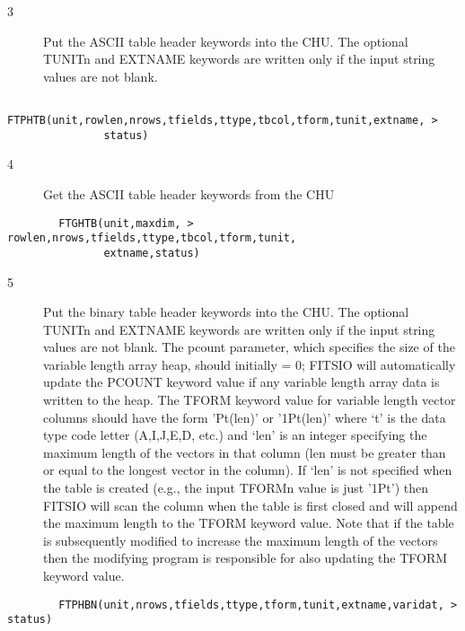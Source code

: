 \documentclass[11pt]{book}
\begin{document}
\begin{description}
\item[3 ] Put the ASCII table header keywords into the CHU. The optional
TUNITn and EXTNAME keywords are written only if the input string
values are not blank.
\end{description}

\begin{verbatim}
        FTPHTB(unit,rowlen,nrows,tfields,ttype,tbcol,tform,tunit,extname, >
               status)
\end{verbatim}

\begin{description}
\item[4 ] Get the ASCII table header keywords from the CHU
\end{description}

\begin{verbatim}
        FTGHTB(unit,maxdim, > rowlen,nrows,tfields,ttype,tbcol,tform,tunit,
               extname,status)
\end{verbatim}

\begin{description}
\item[5 ]Put the binary table header keywords into the CHU. The optional
   TUNITn and EXTNAME keywords are written only if the input string
   values are not blank.  The pcount parameter, which specifies the
   size of the variable length array heap, should initially = 0;
   FITSIO will automatically update the PCOUNT keyword value if any
   variable length array data is written to the heap.  The TFORM keyword
   value for variable length vector columns should have the form 'Pt(len)'
   or '1Pt(len)' where `t' is the data type code letter (A,I,J,E,D, etc.)
   and  `len' is an integer specifying the maximum length of the vectors
   in that column (len must be greater than or equal to the longest
   vector in the column).  If `len' is not specified when the table is
   created (e.g., the input TFORMn value is just '1Pt') then FITSIO will
   scan the column when the table is first closed and will append the
   maximum length to the TFORM keyword value.  Note that if the table
   is subsequently modified to increase the maximum length of the vectors
   then the modifying program is responsible for also updating the TFORM
  keyword value.
\end{description}


\begin{verbatim}
        FTPHBN(unit,nrows,tfields,ttype,tform,tunit,extname,varidat, > status)
\end{verbatim}
\end{document}
